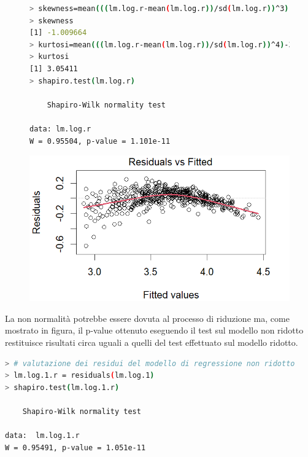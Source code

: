 \documentclass[11pt,a4paper]{article}
\begin{document}
\begin{figure}[h]
    \hspace{-2.00cm}
    \begin{minipage}{.6\textwidth} 
    	\begin{lstlisting}[language=bash,basicstyle=\tiny,tabsize=2,frame = single]
> skewness=mean(((lm.log.r-mean(lm.log.r))/sd(lm.log.r))^3)
> skewness
[1] -1.009664
> kurtosi=mean(((lm.log.r-mean(lm.log.r))/sd(lm.log.r))^4)-3
> kurtosi
[1] 3.05411
> shapiro.test(lm.log.r)
        
    Shapiro-Wilk normality test
        
data: lm.log.r
W = 0.95504, p-value = 1.101e-11
    	\end{lstlisting}
    \end{minipage}
    \hspace{0.07\textwidth}%
    \begin{minipage}{0.5\textwidth} 
    	\includegraphics[scale=.45]{imgs/residuals_log_model.png}
    \end{minipage}
\end{figure}

La non normalità potrebbe essere dovuta al processo di riduzione ma, come mostrato in figura, il p-value ottenuto eseguendo il test sul modello non ridotto restituisce risultati circa uguali a quelli del test effettuato sul modello ridotto.
\vspace{0.5cm}
\begin{lstlisting}[language=bash,basicstyle=\tiny,tabsize=2,frame = single]
> # valutazione dei residui del modello di regressione non ridotto
> lm.log.1.r = residuals(lm.log.1)
> shapiro.test(lm.log.1.r)

	Shapiro-Wilk normality test

data:  lm.log.1.r
W = 0.95491, p-value = 1.051e-11
\end{lstlisting}
\vspace{0.5cm}
\end{document}
